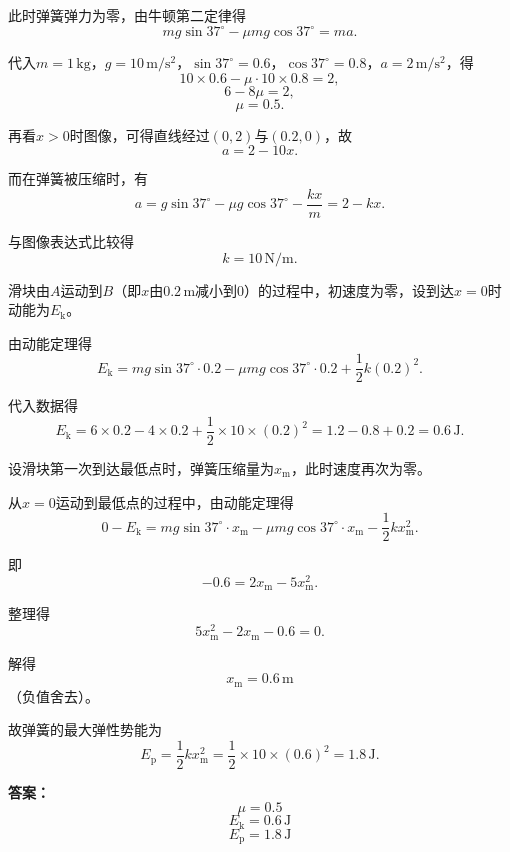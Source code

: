 \documentclass[a4paper,10pt]{ctexart}
\begin{document}
此时弹簧弹力为零，由牛顿第二定律得
\[
mg\sin37^\circ-\mu mg\cos37^\circ=ma.
\]

代入$m=1\,\mathrm{kg}$，$g=10\,\mathrm{m/s^2}$，$\sin37^\circ=0.6$，$\cos37^\circ=0.8$，$a=2\,\mathrm{m/s^2}$，得
\[
10\times 0.6-\mu\cdot 10\times 0.8=2,
\]
\[
6-8\mu=2,
\]
\[
\mu=0.5.
\]

再看$x>0$时图像，可得直线经过$(0,2)$与$(0.2,0)$，故
\[
a=2-10x.
\]

而在弹簧被压缩时，有
\[
a=g\sin37^\circ-\mu g\cos37^\circ-\frac{kx}{m}=2-kx.
\]

与图像表达式比较得
\[
k=10\,\mathrm{N/m}.
\]

滑块由$A$运动到$B$（即$x$由$0.2\,\mathrm{m}$减小到$0$）的过程中，初速度为零，设到达$x=0$时动能为$E_\text{k}$。

由动能定理得
\[
E_\text{k}=mg\sin37^\circ\cdot 0.2-\mu mg\cos37^\circ\cdot 0.2+\frac{1}{2}k(0.2)^2.
\]

代入数据得
\[
E_\text{k}=6\times 0.2-4\times 0.2+\frac{1}{2}\times 10\times (0.2)^2
=1.2-0.8+0.2=0.6\,\mathrm{J}.
\]

设滑块第一次到达最低点时，弹簧压缩量为$x_\text{m}$，此时速度再次为零。

从$x=0$运动到最低点的过程中，由动能定理得
\[
0-E_\text{k}=mg\sin37^\circ\cdot x_\text{m}-\mu mg\cos37^\circ\cdot x_\text{m}-\frac{1}{2}kx_\text{m}^2.
\]

即
\[
-0.6=2x_\text{m}-5x_\text{m}^2.
\]

整理得
\[
5x_\text{m}^2-2x_\text{m}-0.6=0.
\]

解得
\[
x_\text{m}=0.6\,\mathrm{m}
\]
（负值舍去）。

故弹簧的最大弹性势能为
\[
E_\text{p}=\frac{1}{2}kx_\text{m}^2=\frac{1}{2}\times 10\times (0.6)^2=1.8\,\mathrm{J}.
\]

\noindent \textbf{答案：}
\[
\boxed{\mu=0.5}
\]
\[
\boxed{E_\text{k}=0.6\,\mathrm{J}}
\]
\[
\boxed{E_\text{p}=1.8\,\mathrm{J}}
\]
\end{document}
